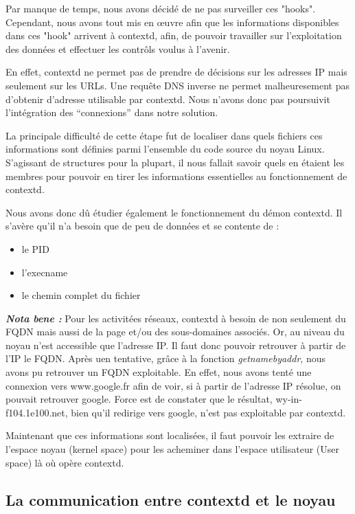 \documentclass[pdftex,a4paper,titlepage,11pt,openright]{article}
\begin{document}
Par manque de temps, nous avons décidé de ne pas surveiller ces "hooks". Cependant, nous avons tout mis en œuvre afin que les informations disponibles dans ces "hook" arrivent à contextd, afin, de pouvoir travailler sur l'exploitation des données et effectuer les contrôls voulus à l'avenir.

En effet, contextd ne permet pas de prendre de décisions sur les adresses IP mais seulement sur les URLs. Une requête DNS inverse ne permet malheuresement pas d'obtenir d'adresse utilisable par contextd. Nous n'avons donc pas poursuivit l'intégration des ``connexions'' dans notre solution.

La principale difficulté de cette étape fut de localiser dans quels fichiers ces informations sont définies parmi l'ensemble du code source du noyau Linux. S'agissant de structures pour la plupart, il nous fallait savoir quels en étaient les membres pour pouvoir en tirer les informations essentielles au fonctionnement de contextd.

Nous avons donc dû étudier également le fonctionnement du démon contextd. Il s'avère qu'il n'a besoin que de peu de données et se contente de :
	\begin{itemize}
		\item le PID
		\item l'execname
		\item le chemin complet du fichier~\\
	\end{itemize}
	
\textit{\textsl{\textbf{Nota bene :}}} Pour les activitées réseaux, contextd à besoin de non seulement du FQDN mais aussi de la page et/ou des sous-domaines associés. Or, au niveau du noyau n'est accessible que l'adresse IP. Il faut donc pouvoir retrouver à partir de l'IP le FQDN. Après uen tentative, grâce à la fonction \textit{getnamebyaddr}, nous avons pu retrouver un FQDN exploitable. En effet, nous avons tenté une connexion vers www.google.fr afin de voir, si à partir de l'adresse IP résolue, on pouvait retrouver google. Force est de constater que le résultat, wy-in-f104.1e100.net, bien qu'il redirige vers google, n'est pas exploitable par contextd.

Maintenant que ces informations sont localisées, il faut pouvoir les extraire de l'espace noyau (kernel space) pour les acheminer dans l'espace utilisateur (User space) là où opère contextd. 

\subsection{La communication entre contextd et le noyau}
\end{document}
